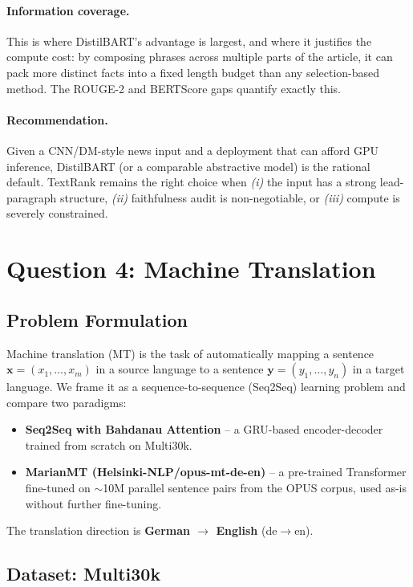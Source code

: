 \documentclass[11pt,a4paper]{article}
\begin{document}
\paragraph{Information coverage.} This is where DistilBART's advantage
is largest, and where it justifies the compute cost: by composing
phrases across multiple parts of the article, it can pack more
distinct facts into a fixed length budget than any selection-based
method. The ROUGE-2 and BERTScore gaps quantify exactly this.

\paragraph{Recommendation.} Given a CNN/DM-style news input and a
deployment that can afford GPU inference, DistilBART (or a comparable
abstractive model) is the rational default. TextRank remains the
right choice when \emph{(i)} the input has a strong lead-paragraph
structure, \emph{(ii)} faithfulness audit is non-negotiable, or
\emph{(iii)} compute is severely constrained.

\section{Question 4: Machine Translation}
\label{sec:q4}

\subsection{Problem Formulation}

Machine translation (MT) is the task of automatically mapping a sentence
$\mathbf{x} = (x_1, \ldots, x_m)$ in a source language to a sentence
$\mathbf{y} = (y_1, \ldots, y_n)$ in a target language. We frame it as a
sequence-to-sequence (Seq2Seq) learning problem and compare two paradigms:
\begin{itemize}[noitemsep]
    \item \textbf{Seq2Seq with Bahdanau Attention} -- a GRU-based
    encoder-decoder trained from scratch on Multi30k.
    \item \textbf{MarianMT (Helsinki-NLP/opus-mt-de-en)} -- a pre-trained
    Transformer fine-tuned on $\sim$10M parallel sentence pairs from the
    OPUS corpus, used as-is without further fine-tuning.
\end{itemize}
The translation direction is \textbf{German $\rightarrow$ English} (de$\rightarrow$en).

\subsection{Dataset: Multi30k}
\end{document}

